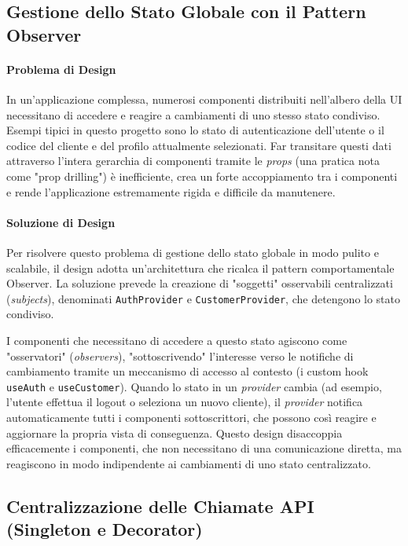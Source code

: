 \documentclass[12pt,a4paper,openright,twoside]{book}
\begin{document}
\FloatBarrier



\subsection{Gestione dello Stato Globale con il Pattern Observer}
\label{subsec:design_observer_frontend}

\paragraph{Problema di Design}
In un'applicazione complessa, numerosi componenti distribuiti nell'albero della UI necessitano di accedere e reagire a cambiamenti di uno stesso stato condiviso. Esempi tipici in questo progetto sono lo stato di autenticazione dell'utente o il codice del cliente e del profilo attualmente selezionati. Far transitare questi dati attraverso l'intera gerarchia di componenti tramite le \textit{props} (una pratica nota come "prop drilling") è inefficiente, crea un forte accoppiamento tra i componenti e rende l'applicazione estremamente rigida e difficile da manutenere.

\paragraph{Soluzione di Design}
Per risolvere questo problema di gestione dello stato globale in modo pulito e scalabile, il design adotta un'architettura che ricalca il pattern comportamentale Observer. La soluzione prevede la creazione di "soggetti" osservabili centralizzati (\textit{subjects}), denominati \texttt{AuthProvider} e \texttt{CustomerProvider}, che detengono lo stato condiviso.

I componenti che necessitano di accedere a questo stato agiscono come "osservatori" (\textit{observers}), "sottoscrivendo" l'interesse verso le notifiche di cambiamento tramite un meccanismo di accesso al contesto (i custom hook \texttt{useAuth} e \texttt{useCustomer}). Quando lo stato in un \textit{provider} cambia (ad esempio, l'utente effettua il logout o seleziona un nuovo cliente), il \textit{provider} notifica automaticamente tutti i componenti sottoscrittori, che possono così reagire e aggiornare la propria vista di conseguenza. Questo design disaccoppia efficacemente i componenti, che non necessitano di una comunicazione diretta, ma reagiscono in modo indipendente ai cambiamenti di uno stato centralizzato.

\subsection{Centralizzazione delle Chiamate API (Singleton e Decorator)}
\label{subsec:design_api_singleton_decorator}
\end{document}
